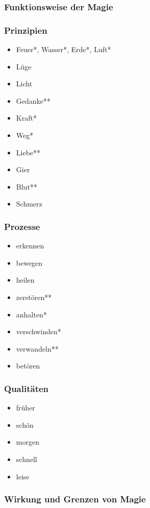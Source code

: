 \subsubsection{Funktionsweise der Magie}

\subsubsection{Prinzipien}
\begin{itemize} 
\item Feuer*, Wasser*, Erde*, Luft*
\item Lüge
\item Licht
\item Gedanke**
\item Kraft*
\item Weg*
\item Liebe**
\item Gier
\item Blut**
\item Schmerz
\end{itemize}

\subsubsection{Prozesse}
\begin{itemize} 
\item erkennen
\item bewegen
\item heilen
\item zerstören**
\item anhalten*
\item verschwinden*
\item verwandeln**
\item betören
\end{itemize}

\subsubsection{Qualitäten}
\begin{itemize} 
\item früher
\item schön
\item morgen
\item schnell
\item leise
\end{itemize}

\subsubsection{Wirkung und Grenzen von Magie}
